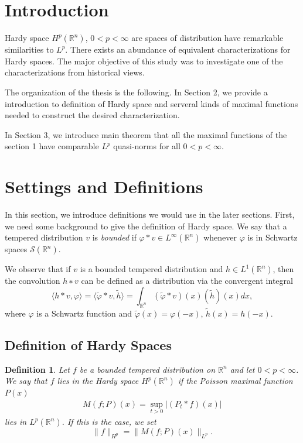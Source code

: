 \documentclass[12pt]{article}  %
\numberwithin{equation}{subsection}
\newtheorem{definition}[thm]{Definition}
\theoremstyle{plain}
\begin{document}
\tableofcontents  %
\newpage

\section{Introduction}  %
Hardy space $H^p(\mathbb{R}^n)$, $0<p<\infty$ are spaces of distribution have remarkable similarities to $L^p$. There exists an abundance of equivalent characterizations for Hardy spaces. The major objective of this study was to investigate one of the characterizations from historical views.

The organization of the thesis is the following. In Section 2, we provide a introduction to definition of Hardy space and serveral kinds of maximal functions needed to construct the desired characterization.

In Section 3, we introduce main theorem that all the maximal functions of the section 1 have comparable $L^p$ quasi-norms for all $0<p<\infty$. 

\section{Settings and Definitions}
In this section, we introduce definitions we would use in the later sections. First, we need some background to give the definition of Hardy space. We say that a tempered distribution $v$ is \textit{bounded} if $\varphi * v \in L^{\infty}(\mathbb{R}^n)$ whenever $\varphi$ is in Schwartz spaces $\mathcal{S}(\mathbb{R}^n)$.

We observe that if $v$ is a bounded tempered distribution and $h \in L^1(\mathbb{R}^n)$, then the convolution $h∗v$ can be defined as a distribution via the convergent integral $$\langle h*v,\varphi\rangle = \langle\tilde{\varphi}*v,\tilde{h}\rangle = \int_{\mathbb{R}^n} (\tilde{\varphi}*v)(x)(\tilde{h})(x)dx,$$ where $\varphi$ is a Schwartz function and $\tilde{\varphi}(x) = \varphi(-x)$, $\tilde{h}(x) = h(-x)$.

\subsection{Definition of Hardy Spaces}
\begin{definition}
	Let $f$ be a bounded tempered distribution on $\mathbb{R}^n$ and let $0<p<\infty$. We say that $f$ lies in the Hardy space $H^p(\mathbb{R}^n)$ if the Poisson maximal function $P(x)$
	\begin{align}
	M(f;P)(x) = \sup_{t>0}|(P_t*f)(x)| 
	\end{align}
	lies in $L^p(\mathbb{R}^n)$. If this is the case, we set $$\|f\|_{H^p} = \|M(f;P)(x)\|_{L^p}.$$ 
\end{definition}
	
\end{document}
